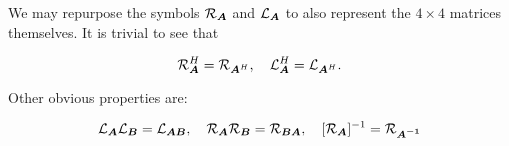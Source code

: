 \documentclass[useAMS,usenatbib]{mn2e}
\newcommand{\COMPLEX}{\mathbb{C}}
\newcommand{\mat}[1]{{\bmath{#1}}}
\begin{document}





We may repurpose the symbols $\Rop{\mat{A}}$ and $\Lop{\mat{A}}$ to also represent the $4\times4$ matrices 
themselves. It is trivial to see that

\begin{equation}
\label{eq:RH:LH}
\Rop{\mat{A}}^H = \Rop{\mat{A}^H},~~~\Lop{\mat{A}}^H = \Lop{\mat{A}^H}.
\end{equation}



Other obvious properties are:

\begin{equation}
\label{eq:RAB:LAB}
\Lop{\mat{A}}\Lop{\mat{B}} = \Lop{\mat{AB}},~~~\Rop{\mat{A}}\Rop{\mat{B}} = \Rop{\mat{BA}},~~~[\Rop{\mat{A}}]^{-1} = \Rop{\mat{A^{-1}}}
\end{equation}
\end{document}
